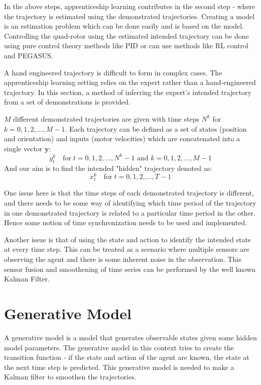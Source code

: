 \documentclass[hidelinks,BTech]{iitmdiss}
\begin{document}
In the above steps, apprenticeship learning contributes in the second step - where the trajectory is estimated using the demonstrated trajectories. Creating a model is an estimation problem \cite{EstTheo} which can be done easily and is based on the model. Controlling the quad-rotor using the estimated intended trajectory can be done using pure control theory methods like PID or can use methods like RL control and PEGASUS.

A hand engineered trajectory is difficult to form in complex cases. The apprenticeship learning setting relies on the expert rather than a hand-engineered trajectory. In this section, a method of inferring the expert's intended trajectory from a set of demonstrations is provided.

$M$ different demonstrated trajectories are given with time steps $N^k$ for $k = 0, 1, 2, ..., M-1$. Each trajectory can be defined as a set of states (position and orientation) and inputs (motor velocities) which are concatenated into a single vector $\mathbf{y}$:
\begin{equation}
  y_{t}^{k} \quad \text{for} \; t = 0, 1, 2, ..., N^{k}-1 \text{ and } k = 0, 1, 2, ..., M-1
\end{equation}
And our aim is to find the intended "hidden" trajectory denoted as:
\begin{equation}
  x_{t}^{k} \quad \text{for} \; t = 0, 1, 2, ..., T-1
\end{equation}

One issue here is that the time steps of each demonstrated trajectory is different, and there needs to be some way of identifying which time period of the trajectory in one demonstrated trajectory is related to a particular time period in the other. Hence some notion of time synchronization needs to be used and implemented.

Another issue is that of using the state and action to identify the intended state at every time step. This can be treated as a scenario where multiple sensors are observing the agent and there is some inherent noise in the observation. This sensor fusion and smoothening of time series can be performed by the well known Kalman Filter.

\section{Generative Model}

A generative model is a model that generates observable states given some hidden model parameters. The generative model in this context tries to create the transition function - if the state and action of the agent are known, the state at the next time step is predicted. This generative model is needed to make a Kalman filter to smoothen the trajectories.
\end{document}
